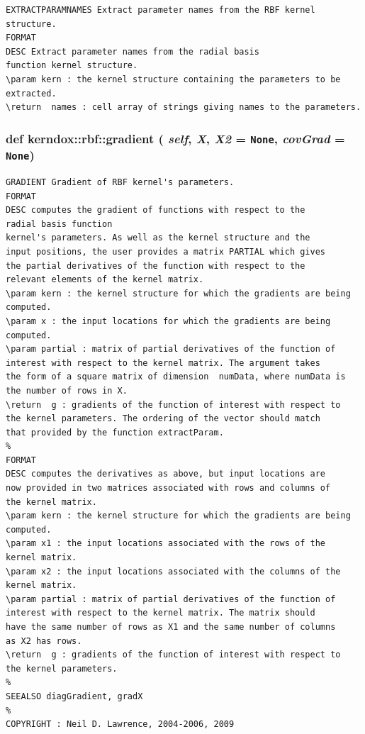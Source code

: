 \footnotesize\begin{verbatim}EXTRACTPARAMNAMES Extract parameter names from the RBF kernel structure.
FORMAT
DESC Extract parameter names from the radial basis
function kernel structure.
\param kern : the kernel structure containing the parameters to be
extracted.
\return  names : cell array of strings giving names to the parameters.

\end{verbatim}
\normalsize
 \hypertarget{classkerndox_1_1rbf_5cbf99c41f037ab3982c8595036ff205}{
\subsubsection[{gradient}]{\setlength{\rightskip}{0pt plus 5cm}def kerndox::rbf::gradient ( {\em self}, \/   {\em X}, \/   {\em X2} = {\tt None}, \/   {\em covGrad} = {\tt None})}}
\label{classkerndox_1_1rbf_5cbf99c41f037ab3982c8595036ff205}




\footnotesize\begin{verbatim}GRADIENT Gradient of RBF kernel's parameters.
FORMAT
DESC computes the gradient of functions with respect to the
radial basis function
kernel's parameters. As well as the kernel structure and the
input positions, the user provides a matrix PARTIAL which gives
the partial derivatives of the function with respect to the
relevant elements of the kernel matrix. 
\param kern : the kernel structure for which the gradients are being
computed.
\param x : the input locations for which the gradients are being
computed. 
\param partial : matrix of partial derivatives of the function of
interest with respect to the kernel matrix. The argument takes
the form of a square matrix of dimension  numData, where numData is
the number of rows in X.
\return  g : gradients of the function of interest with respect to
the kernel parameters. The ordering of the vector should match
that provided by the function extractParam.
%
FORMAT
DESC computes the derivatives as above, but input locations are
now provided in two matrices associated with rows and columns of
the kernel matrix. 
\param kern : the kernel structure for which the gradients are being
computed.
\param x1 : the input locations associated with the rows of the
kernel matrix.
\param x2 : the input locations associated with the columns of the
kernel matrix.
\param partial : matrix of partial derivatives of the function of
interest with respect to the kernel matrix. The matrix should
have the same number of rows as X1 and the same number of columns
as X2 has rows.
\return  g : gradients of the function of interest with respect to
the kernel parameters.
%
SEEALSO diagGradient, gradX
%
COPYRIGHT : Neil D. Lawrence, 2004-2006, 2009

\end{verbatim}
\normalsize
 

